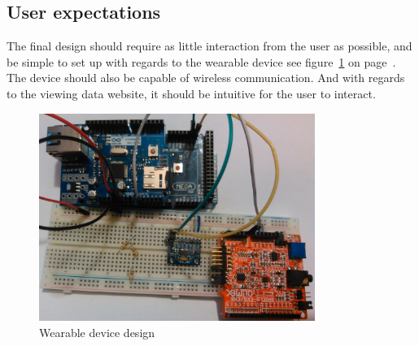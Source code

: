 \documentclass[12pt,]{article}
\numberwithin{figure}{section}
\begin{document}
\subsection{User expectations}
The final design should require as little interaction from the user as possible, and be simple to set up with regards to the wearable device see figure~\ref{fig:28} on page~\pageref{fig:28}. The device should also be capable of wireless communication. And with regards to the viewing data website, it should be intuitive for the user to interact.
\begin{figure}[h]
  	\begin{center}
    	\includegraphics[width=0.8\textwidth]{29}
  	\end{center}
  	\caption{Wearable device design}
	\label{fig:28}
\end{figure}
\end{document}
